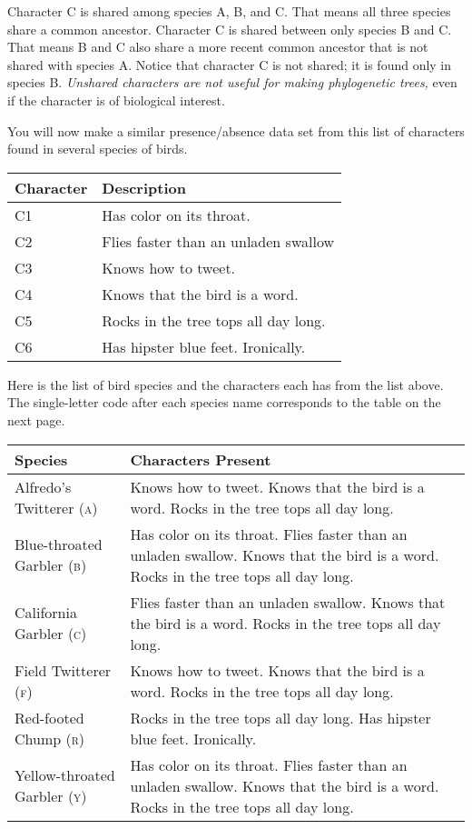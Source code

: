 \documentclass[12pt, hidelinks]{exam}
\begin{document}
Character C{} is shared among species A, B, and C. That means all three species share a common ancestor. Character C{} is shared between only species B and C. That means B and C also share a more recent common ancestor that is not shared with species A. Notice that character C{} is not shared; it is found only in species B. \emph{Unshared characters are not useful for making phylogenetic trees,} even if the character is of biological interest.


\vspace{\baselineskip}

\begin{questions}

\question
You will now make a similar presence/absence data set from this list of characters found in several species of birds. 

{\liningnum
\begin{tabular}{ll}
\toprule
Character	&	Description	\tabularnewline
\midrule
C1	&	Has color on its throat.	\tabularnewline
C2	&	Flies faster than an unladen swallow \tabularnewline
C3	&	Knows how to tweet. \tabularnewline
C4	&	Knows that the bird is a word. \tabularnewline
C5	&	Rocks in the tree tops all day long. \tabularnewline
C6	&	Has hipster blue feet. Ironically. \tabularnewline
\bottomrule
\end{tabular}
}

\vspace{\baselineskip}

Here is the list of bird species and the characters each has from the list above. The single-letter  code after each species name corresponds to the table on the next page.

\begin{longtable}[l]{@{}lL{3.5in}@{}}
\toprule
Species	&	Characters Present	\tabularnewline
\midrule
Alfredo's Twitterer \textsc{(a)} & Knows how to tweet. Knows that the bird is a word. Rocks in the tree tops all day long.\tabularnewline
Blue-throated Garbler \textsc{(b)} & Has color on its throat. Flies faster than an unladen swallow. Knows that the bird is a word. Rocks in the tree tops all day long. \tabularnewline
California Garbler \textsc{(c)} & Flies faster than an unladen swallow. Knows that the bird is a word. Rocks in the tree tops all day long. \tabularnewline
Field Twitterer \textsc{(f)} & Knows how to tweet. Knows that the bird is a word. Rocks in the tree tops all day long. \tabularnewline
Red-footed Chump \textsc{(r)} & Rocks in the tree tops all day long. Has hipster blue feet. Ironically. \tabularnewline
Yellow-throated Garbler \textsc{(y)} & Has color on its throat. Flies faster than an unladen swallow. Knows that the bird is a word. Rocks in the tree tops all day long. \tabularnewline
\bottomrule
\end{longtable}


\end{questions}
\end{document}
